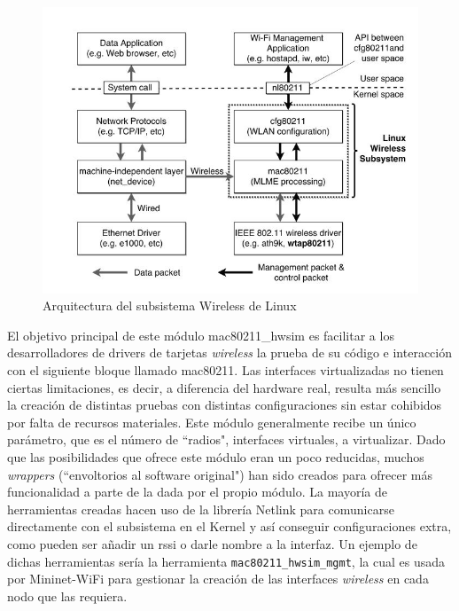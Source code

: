 \begin{figure}[ht]
    \centering
    \includegraphics[width=14cm]{archivos/img/dev/p4-wifi/analysis/linux_wireless_subsystem.JPG}
    \caption{Arquitectura del subsistema Wireless de Linux \cite{8330098}}
    \label{fig:analysis_p4_wifi_6}
\end{figure}

El objetivo principal de este módulo mac80211\_hwsim es facilitar a los desarrolladores de drivers de tarjetas \textit{wireless} la prueba de su código e interacción con el siguiente bloque llamado mac80211. Las interfaces virtualizadas no tienen ciertas limitaciones, es decir, a diferencia del hardware real, resulta más sencillo la creación de distintas pruebas con distintas configuraciones sin estar cohibidos por falta de recursos materiales. Este módulo generalmente recibe un único parámetro, que es el número de ``radios", interfaces virtuales, a virtualizar. Dado que las posibilidades que ofrece este módulo eran un poco reducidas, muchos \textit{wrappers} (``envoltorios al software original") han sido creados para ofrecer más funcionalidad a parte de la dada por el propio módulo. La mayoría de herramientas creadas hacen uso de la librería Netlink para comunicarse directamente con el subsistema en el Kernel y así conseguir configuraciones extra, como pueden ser añadir un \gls{rssi} o darle nombre a la interfaz. Un ejemplo de dichas herramientas sería la herramienta \texttt{mac80211\_hwsim\_mgmt}, la cual es usada por Mininet-WiFi para gestionar la creación de las interfaces \textit{wireless} en cada nodo que las requiera.\\
\par

